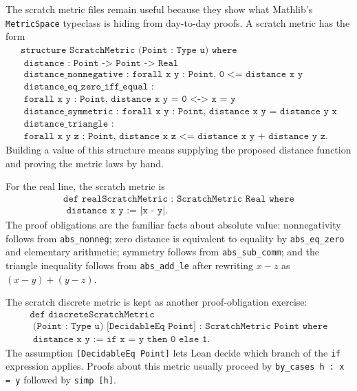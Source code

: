 \begin{remark*}
The scratch metric files remain useful because they show what Mathlib's
\texttt{MetricSpace} typeclass is hiding from day-to-day proofs. A scratch
metric has the form
\[
\begin{gathered}
  \texttt{structure ScratchMetric (Point : Type u) where}\\
  \texttt{\ \ distance : Point -> Point -> Real}\\
  \texttt{\ \ distance\_nonnegative : forall x y : Point, 0 <= distance x y}\\
  \texttt{\ \ distance\_eq\_zero\_iff\_equal :}\\
  \texttt{\ \ \ \ forall x y : Point, distance x y = 0 <-> x = y}\\
  \texttt{\ \ distance\_symmetric : forall x y : Point, distance x y = distance y x}\\
  \texttt{\ \ distance\_triangle :}\\
  \texttt{\ \ \ \ forall x y z : Point, distance x z <= distance x y + distance y z.}
\end{gathered}
\]
Building a value of this structure means supplying the proposed distance
function and proving the metric laws by hand.
\end{remark*}

\begin{example*}
For the real line, the scratch metric is
\[
\begin{gathered}
  \texttt{def realScratchMetric : ScratchMetric Real where}\\
  \texttt{\ \ distance x y := |x - y|.}
\end{gathered}
\]
The proof obligations are the familiar facts about absolute value:
nonnegativity follows from \texttt{abs\_nonneg}; zero distance is equivalent to
equality by \texttt{abs\_eq\_zero} and elementary arithmetic; symmetry follows
from \texttt{abs\_sub\_comm}; and the triangle inequality follows from
\texttt{abs\_add\_le} after rewriting \(x-z\) as \((x-y)+(y-z)\).
\end{example*}

\begin{remark*}
The scratch discrete metric is kept as another proof-obligation exercise:
\[
\begin{gathered}
  \texttt{def discreteScratchMetric}\\
  \texttt{\ \ \ \ (Point : Type u) [DecidableEq Point] : ScratchMetric Point where}\\
  \texttt{\ \ distance x y := if x = y then 0 else 1.}
\end{gathered}
\]
The assumption \texttt{[DecidableEq Point]} lets Lean decide which branch of
the \texttt{if} expression applies. Proofs about this metric usually proceed by
\texttt{by\_cases h : x = y} followed by \texttt{simp [h]}.
\end{remark*}

